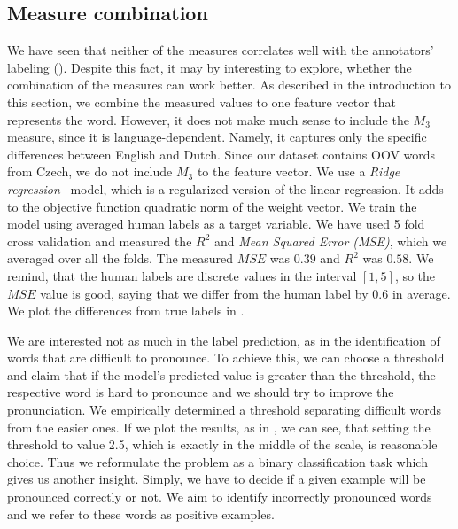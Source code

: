 \subsection{Measure combination}
\label{mcomb}
We have seen that neither of the measures correlates well with the annotators' labeling ().
Despite this fact, it may by interesting to explore, whether the combination of the measures can work better.
As described in the introduction to this section, we combine the measured values to one feature vector that represents the word.
However, it does not make much sense to include the $M_3$ measure, since it is language-dependent.
Namely, it captures only the specific differences between English and Dutch.
Since our dataset contains OOV words from Czech, we do not include $M_3$ to the feature vector.
We use a \textit{Ridge regression}~\cite{hoerl1970ridge} model, which is a regularized version of the linear regression.
It adds to the objective function quadratic norm of the weight vector.
We train the model using averaged human labels as a target variable.
We have used 5 fold cross validation and measured the $R^2$ and \textit{Mean Squared Error (MSE)}, which we averaged over all the folds.
The measured $MSE$ was $0.39$ and $R^2$ was $0.58$.
We remind, that the human labels are discrete values in the interval $[1,5]$, so the $MSE$ value is good, saying that we differ from the human label by $0.6$ in average.
We plot the differences from true labels in .
\par
We are interested not as much in the label prediction, as in the identification of words that are difficult to pronounce.
To achieve this, we can choose a threshold and claim that if the model's predicted value is greater than the threshold, the respective word is hard to pronounce and we should try to improve the pronunciation.
We empirically determined a threshold separating difficult words from the easier ones.
If we plot the results, as in , we can see, that setting the threshold to value 2.5, which is exactly in the middle of the scale, is reasonable choice.
Thus we reformulate the problem as a binary classification task which gives us another insight.
Simply, we have to decide if a given example will be pronounced correctly or not.
We aim to identify incorrectly pronounced words and we refer to these words as positive examples.

